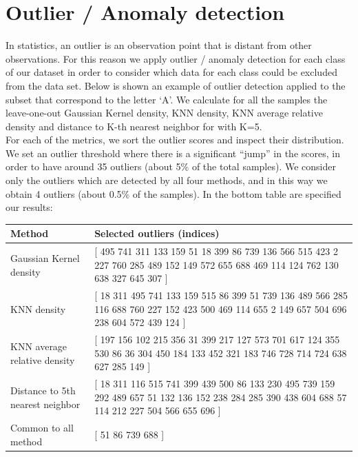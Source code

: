 \chapter*{Outlier / Anomaly detection}
\setcounter{chapter}{3}

In statistics, an outlier is an observation point that is distant from other observations. For this reason we apply outlier / anomaly detection for each class of our dataset in order to consider which data for each class could be excluded from the data set.
Below is shown an example of outlier detection applied to the subset that correspond to the letter `A'.
We calculate for all the samples the leave-one-out Gaussian Kernel density, KNN density, KNN average relative density and distance to K-th nearest neighbor for with K=5.\\
For each of the metrics, we sort the outlier scores and inspect their distribution. We set an outlier threshold where there is a significant ``jump'' in the scores, in order to have around 35 outliers (about 5\% of the total samples). We consider only the outliers which are detected by all four methods, and in this way we obtain 4 outliers (about 0.5\% of the samples).
In the bottom table are specified our results:
\begin{center}
    \begin{tabular}{ | p{3cm} | p{9cm} |}
    \hline
    \textbf{Method}  & \textbf{Selected outliers (indices)} \\ 
    \hline
    Gaussian Kernel density & [
   495
   741
   311
   133
   159
    51
    18
   399
    86
   739
   136
   566
   515
   423
     2
   227
   760
   285
   489
   152
   149
   572
   655
   688
   469
   114
   124
   762
   130
   638
   327
   645
   307 ]\\ 
    \hline
    KNN density & [ 18
   311
   495
   741
   133
   159
   515
    86
   399
    51
   739
   136
   489
   566
   285
   116
   688
   760
   227
   152
   423
   500
   469
   114
   655
     2
   149
   657
   504
   696
   238
   604
   572
   439
   124 ] \\ 
    \hline
    KNN average relative density & [ 197
   156
   102
   215
   356
    31
   399
   217
   127
   573
   701
   617
   124
   355
   530
    86
    36
   304
   450
   184
   133
   452
   321
   183
   746
   728
   714
   724
   638
   627
   285
   149 ]\\ 
    \hline
    Distance to 5th nearest neighbor & [     18
   311
   116
   515
   741
   399
   439
   500
    86
   133
   230
   495
   739
   159
   292
   489
   657
    51
   132
   136
   152
   238
   284
   285
   390
   438
   604
   688
    57
   114
   212
   227
   504
   566
   655
   696 ]\\ 
    \hline
    Common to all method & [ 51    86   739   688 ]\\ 
    \hline
    \end{tabular}
\end{center}

